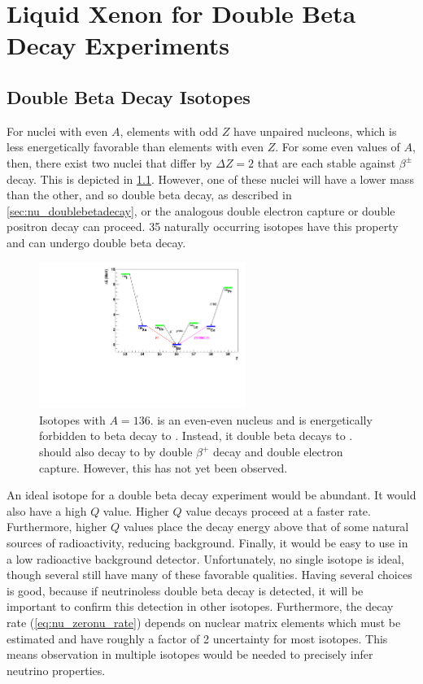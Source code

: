 \documentclass[herrin-thesis.tex]{subfiles}
\begin{document}
\chapter[LXe for \(\beta\beta\) decay experiments]{Liquid Xenon for Double Beta Decay Experiments}
\label{ch:liquidxe}

\section{Double Beta Decay Isotopes}
For nuclei with even \(A\), elements with odd \(Z\) have unpaired nucleons, which is less energetically favorable than elements with even \(Z\). For some even values of \(A\), then, there exist two nuclei that differ by \(\Delta Z = 2\) that are each stable against \(\beta^{\pm}\) decay. This is depicted in \cref{fig:xe_nuclei_masses}. However, one of these nuclei will have a lower mass than the other, and so double beta decay, as described in \cref{sec:nu_doublebetadecay}, or the analogous double electron capture or double positron decay can proceed. 35 naturally occurring isotopes have this property and can undergo double beta decay.

\begin{figure}[htb]
\centering
\includegraphics[width=0.6\textwidth]{./plots/xe_nuclei_masses.pdf}
\caption[Nuclear decay structure for \(A=136\)]{Isotopes with \(A=136\).  is an even-even nucleus and is energetically forbidden to beta decay to . Instead, it double beta decays to .  should also decay to  by double \(\beta^{+}\) decay and double electron capture. However, this has not yet been observed.}
\label{fig:xe_nuclei_masses}
\end{figure}

An ideal isotope for a double beta decay experiment would be abundant. It would also have a high \(Q\) value. Higher \(Q\) value decays proceed at a faster rate. Furthermore, higher \(Q\) values place the decay energy above that of some natural sources of radioactivity, reducing background. Finally, it would be easy to use in a low radioactive background detector. Unfortunately, no single isotope is ideal, though several still have many of these favorable qualities. Having several choices is good, because if neutrinoless double beta decay is detected, it will be important to confirm this detection in other isotopes. Furthermore, the decay rate (\cref{eq:nu_zeronu_rate}) depends on nuclear matrix elements which must be estimated and have roughly a factor of 2 uncertainty for most isotopes. This means observation in multiple isotopes would be needed to precisely infer neutrino properties.
\end{document}
